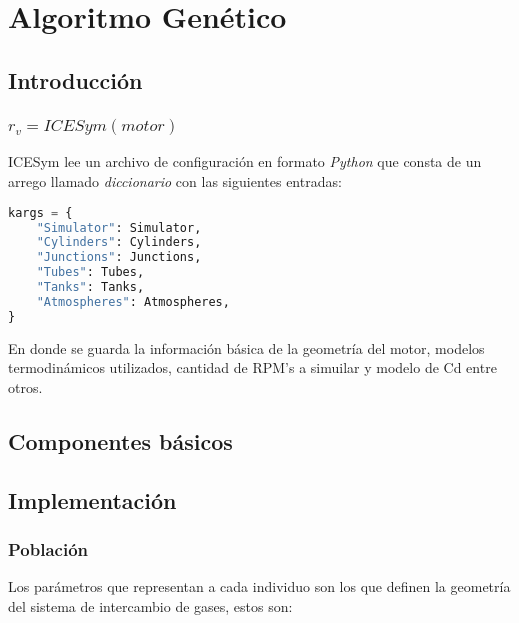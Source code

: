 \chapter{Algoritmo Genético}

\section{Introducción}

\subsection{$r_v = ICESym(motor)$}
%
ICESym lee un archivo de configuración en formato \emph{Python} que consta de
un arrego llamado \emph{diccionario} con las siguientes entradas:

\begin{lstlisting}[language=Python]
kargs = {
    "Simulator": Simulator,
    "Cylinders": Cylinders,
    "Junctions": Junctions,
    "Tubes": Tubes,
    "Tanks": Tanks,
    "Atmospheres": Atmospheres,
}
\end{lstlisting}

En donde se guarda la información básica de la geometría del motor, modelos
termodinámicos utilizados, cantidad de RPM's a simuilar y modelo de Cd entre
otros.








\section{Componentes básicos}
%



\section{Implementación}

\subsection{Población}
%
Los parámetros que representan a cada individuo son los que definen la geometría
del sistema de intercambio de gases, estos son:

